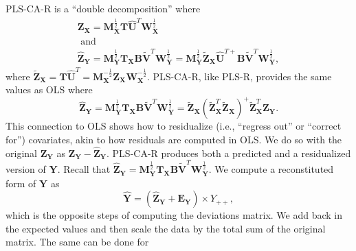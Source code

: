 \documentclass[12pt]{article}
\begin{document}
PLS-CA-R is a ``double decomposition'' where \begin{equation}
\begin{aligned}
{\mathbf Z}_{\mathbf X} = {\mathbf M}^{\frac{1}{2}}_{\mathbf X}{\mathbf T}\widehat{\mathbf U}^{T}{\mathbf W}^{\frac{1}{2}}_{\mathbf X} \\ \text{ and } \\
\widehat{{\mathbf Z}}_{\mathbf Y} = {\mathbf M}^{\frac{1}{2}}_{\mathbf Y}{\mathbf T}_{\mathbf X}{\mathbf B}\widetilde{\mathbf V}^{T}{\mathbf W}^{\frac{1}{2}}_{\mathbf Y} = {\mathbf M}^{\frac{1}{2}}_{\mathbf Y}\widetilde{\mathbf Z}_{\mathbf X}\widehat{\mathbf U}^{{T}{+}}{\mathbf B}\widetilde{\mathbf V}^{T}{\mathbf W}^{\frac{1}{2}}_{\mathbf Y},
\label{eq:doubledecomp}
\end{aligned}
\end{equation} where
\(\widetilde{\mathbf Z}_{\mathbf X} = {\mathbf T}\widehat{\mathbf U}^{T} = {\mathbf M}_{\mathbf X}^{-\frac{1}{2}}{\mathbf Z}_{\mathbf X}{\mathbf W}_{\mathbf X}^{-\frac{1}{2}}\).
PLS-CA-R, like PLS-R, provides the same values as OLS where
\begin{equation}
\widehat{{\mathbf Z}}_{\mathbf Y} = {\mathbf M}^{\frac{1}{2}}_{\mathbf Y}{\mathbf T}_{\mathbf X}{\mathbf B}\widetilde{\mathbf V}^{T}{\mathbf W}^{\frac{1}{2}}_{\mathbf Y} = \widetilde{\mathbf Z}_{\mathbf X} (\widetilde{\mathbf Z}_{\mathbf X}^{T}\widetilde{\mathbf Z}_{\mathbf X})^{+} \widetilde{\mathbf Z}_{\mathbf X}^T {\mathbf Z}_{\mathbf Y}.
\label{ols_equivalence}
\end{equation} This connection to OLS shows how to residualize (i.e.,
``regress out'' or ``correct for'') covariates, akin to how residuals
are computed in OLS. We do so with the original
\({\mathbf Z}_{\mathbf Y}\) as
\({\mathbf Z}_{\mathbf Y} - \widehat{\mathbf Z}_{\mathbf Y}\). PLS-CA-R
produces both a predicted and a residualized version of \({\mathbf Y}\).
Recall that
\(\widehat{{\mathbf Z}}_{\mathbf Y} = {\mathbf M}^{\frac{1}{2}}_{\mathbf Y}{\mathbf T}_{\mathbf X}{\mathbf B}\widetilde{\mathbf V}^{T}{\mathbf W}^{\frac{1}{2}}_{\mathbf Y}\).
We compute a reconstituted form of \({\mathbf Y}\) as \begin{equation}
\widehat{\mathbf Y} = (\widehat{{\mathbf Z}}_{\mathbf Y} + {\mathbf E}_{\mathbf Y}) \times Y_{++},
\label{eq:Yhat}
\end{equation} which is the opposite steps of computing the deviations
matrix. We add back in the expected values and then scale the data by
the total sum of the original matrix. The same can be done for
\end{document}
